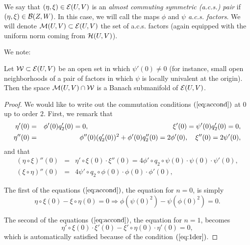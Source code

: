 We say that $(\eta,\xi)\in\mathcal{E}(U,V)$ is an {\it almost commuting symmetric (a.c.s.) pair} if $(\eta,\xi)\in\mathcal{B}(Z,W)$.
In this case, we will call the maps $\phi$ and $\psi$ {\it a.c.s. factors}. 
We will denote $\mathcal{M}(U,V)\subset \mathcal{E}(U,V)$ the set of a.c.s. factors (again equipped with the uniform norm coming from $\mathcal{H}(U,V)$).


We note:

\begin{prop}
\label{prop-submfld1} Let $\mathcal{W}\subset \mathcal{E}(U,V)$  be an open set in which $\psi'(0)\neq 0$ (for instance, small open neighborhoods
 of a pair of factors in which $\psi$ is locally univalent at the origin).
Then the  space  $\mathcal{M}(U,V)\cap \mathcal{W}$ is a Banach submanifold of $\mathcal{E}(U,V)$.
\end{prop}
\begin{proof}

We would like to write out the commutation conditions $(\ref{eq:accond})$ at $0$ up to order $2$. First, we remark that 
\begin{eqnarray}
\label{eq:1der} \eta'(0)&=&\phi'(0) q_2'(0)=0,  \hspace{43mm}  \xi'(0)=\psi'(0)  q_2'(0)=0,\\
\label{eq:2der} \eta''(0)&=&\phi''(0) (q'_2(0))^2 +\phi'(0) q_2''(0)=2 \phi'(0), \quad  \xi''(0)=2 \psi'(0),
\end{eqnarray}
and that 
\begin{eqnarray}
\label{eq:2etaxider} (\eta \circ \xi)''(0)&=&\eta' \circ \xi(0) \cdot \xi''(0)=4 \phi' \circ q_2 \circ \psi(0) \cdot \psi (0) \cdot \psi'(0), \\
\label{eq:2xietader} (\xi \circ \eta)''(0)&=&4 \psi' \circ q_2 \circ \phi(0) \cdot \phi (0) \cdot \phi'(0),
\end{eqnarray}


{ The first of the equations $(\ref{eq:accond})$, the equation  for $n=0$}, is simply
\begin{equation}\label{eq:accond0}
\eta \circ \xi(0) -\xi \circ \eta(0)=0 \Rightarrow \phi(\psi(0)^2)-\psi(\phi(0)^2)=0.
\end{equation}

{ The second of the equations $(\ref{eq:accond})$, the equation  for $n=1$}, becomes
\begin{equation}\label{eq:accond1}
\eta' \circ \xi(0) \cdot \xi'(0) -\xi' \circ \eta(0) \cdot \eta'(0)=0,
\end{equation}
which is automatically satisfied  because of the condition $(\ref{eq:1der})$.


\end{proof}
